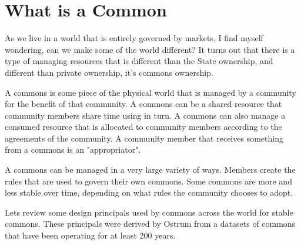 \documentclass{article}
\begin{document}
\pagebreak

\section{What is a Common}

\vspace{0.2cm}

As we live in a world that is entirely governed by markets, I find myself wondering, can we make some of the world different? It turns out that there is a type of managing resources that is different than the State ownership, and different than private ownership, it's commons ownership. 

A commons is some piece of the physical world that is managed by a community for the benefit of that community. A commons can be a shared resource that community members share time using in turn. A commons can also manage a consumed resource that is allocated to community members according to the agreements of the community. A community member that receives something from a commons is an "appropriator".

A commons can be managed in a very large variety of ways. Members create the rules that are used to govern their own commons. Some commons are more and less stable over time, depending on what rules the community chooses to adopt. 


Lets review some design principals used by commons across the world for stable commons. These principals were derived by Ostrum from a datasets of commons that have been operating for at least 200 years. 
\end{document}

